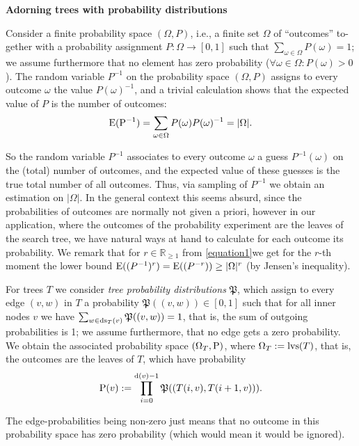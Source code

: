 \documentclass{report}
\def\E{{\rm E}}
\def\P{{\rm P}}
\begin{document}
\begin{enumerate}
			{\bf Adorning trees with probability distributions}
			
			Consider a finite probability space $(\Omega ,P)$, i.e., a finite set $\Omega$  of ``outcomes'' to-
			gether with a probability assignment $P : \Omega  \to [0,1]$ such that
			$\sum_{\omega \in \Omega} P(\omega ) = 1$; we
			assume furthermore that no element has zero probability ($\forall\omega \in \Omega  : P(\omega ) > 0$).
			The random variable $P^{-1}$ on the probability space $(\Omega ,P)$ assigns to every outcome $\omega$ the value $P(\omega )^{-1} $, and a trivial calculation shows that the expected value
			of $P$ is the number of outcomes:
			\begin{align}\label{equation1}
			\E(\P^{-1} ) =\sum_{\omega \in \Omega}
			P(\omega )P(\omega )^{-1} = |\Omega |.
			\end{align}
			
			So the random variable $P^{-1}$ associates to every outcome $\omega$ a guess $P^{-1} (\omega )$ on
			the (total) number of outcomes, and the expected value of these guesses is the
			true total number of all outcomes. Thus, via sampling of $P^{-1}$ we obtain an
			estimation on $|\Omega |$. In the general context this seems absurd, since the probabilities
			of outcomes are normally not given a priori, however in our application, where
			the outcomes of the probability experiment are the leaves of the search tree, we
			have natural ways at hand to calculate for each outcome its probability. We
			remark that for $ r \in \mathbb{R}_{\geq 1}$ from \ref{equation1}we get for the $r$-th moment the lower bound
			$\E((P^{-1} )^ r ) = \E((P^{-r} )) \geq |\Omega |^ r$ (by Jensen's inequality).
			
			{ For trees $T$ we consider {\it tree probability distributions} $\mathfrak{P}$, which
				assign to every edge $(v,w)$ in $T$ a probability $\mathfrak{P}((v,w)) \in [0,1]$ such that for all
				inner nodes $v$ we have $\sum_{w\in {\rm ds}_ T (v)} \mathfrak{P}((v,w)) = 1$, that is, the sum of outgoing
				probabilities is 1; we assume furthermore, that no edge gets a zero probability.
				We obtain the associated probability space $(\Omega_ T ,\P)$, where $\Omega_T := {\rm lvs}(T)$, that is,
				the outcomes are the leaves of $T$, which have probability
				\begin{align}
				\P(v) :=\prod^{{\rm d}(v)-1}_{i=0}\mathfrak{P}((T(i,v),T(i + 1,v))).
				\end{align}
				
				The edge-probabilities being non-zero just means that no outcome in this
				probability space has zero probability (which would mean it would be ignored).}
			

\end{enumerate}
\end{document}

